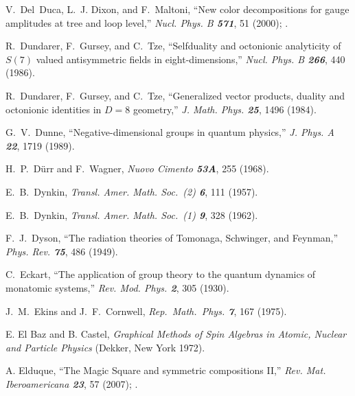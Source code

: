 V.~Del~Duca, L.~J. Dixon, and F.~Maltoni,
        ``New color decompositions for gauge amplitudes
        at tree and loop level,''
        {\em Nucl. Phys. B \bf 571}, 51 (2000); %
        .

R.~Dundarer, F.~Gursey, and C.~Tze,
``Selfduality and octonionic analyticity of $S(7)$ valued antisymmetric fields
in eight-dimensions,''
{\em Nucl.  Phys.   B \bf 266}, 440 (1986).

R.~Dundarer, F.~Gursey, and C.~Tze,
``Generalized vector products, duality and octonionic
identities in $D = 8$ geometry,''
{\em J.  Math.  Phys.    \bf 25}, 1496 (1984).

 G.~V.~Dunne,
    ``Negative-dimensional groups in quantum physics,''
    {\em J. Phys. A \bf  22}, 1719 (1989). %

H.~P.~D{\"u}rr and F.~Wagner,
{\em Nuovo Cimento  \bf 53A}, 255 (1968).

 E.~B.~Dynkin,
{\em Transl. Amer. Math. Soc.~(2)  \bf 6}, 111 (1957).

 E.~B.~Dynkin,
{\em Transl. Amer. Math. Soc.~(1)  \bf 9}, 328 (1962).

 F.~J.~Dyson,
``The radiation theories of Tomonaga, Schwinger, and Feynman,''
{\em Phys. Rev. \bf 75}, 486 (1949). %


 C.~Eckart,
``The application of group theory to the quantum dynamics of monatomic
systems,''
{\em Rev. Mod. Phys.  \bf 2}, 305 (1930).

J.~M.~Ekins and J.~F.~Cornwell,
{\em Rep.~Math.~Phys.  \bf 7}, 167 (1975).

 E. El Baz and B. Castel,
{\em Graphical Methods of Spin Algebras in Atomic,
Nuclear and Particle Physics}
(Dekker, New York 1972).

  A. Elduque,
    ``The Magic Square and symmetric compositions II,''
    {\em Rev. Mat. Iberoamericana \bf 23}, 57 (2007); %
    .

